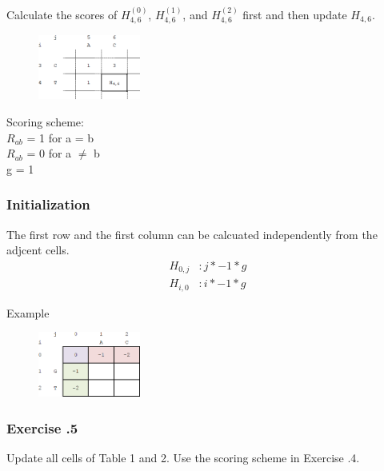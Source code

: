 Calculate the scores of $H_{4,6}^{(0)}$, $H_{4,6}^{(1)}$, and $H_{4,6}^{(2)}$ first and then update $H_{4,6}$.
\begin{multicols}{2}
\begin{figure}[H]
  \centering
      \includegraphics[width=0.3\textwidth]{fig02/dynamic_programmoing_cell_update_exercise.png}
\end{figure}

\noindent Scoring scheme: \\ 
$R_{ab}$ = 1 for a = b \\ 
$R_{ab}$ = 0 for a $\neq$ b \\ 
g = 1

\end{multicols} 

%
%
\subsubsection*{Initialization}

The first row and the first column can be calcuated independently from the adjcent cells.
\begin{align*}
H_{0,j} &:  j * -1 * g \\
H_{i,0} &: i * -1 * g
\end{align*}

\noindent
Example
\begin{figure}[H]
  \centering
      \includegraphics[width=0.3\textwidth]{fig02/dynamic_programmoing_initialization.png}
\end{figure}

%
%
\subsubsection*{Exercise \thesection.5}
Update all cells of Table 1 and 2. Use the scoring scheme in Exercise \thesection.4.


